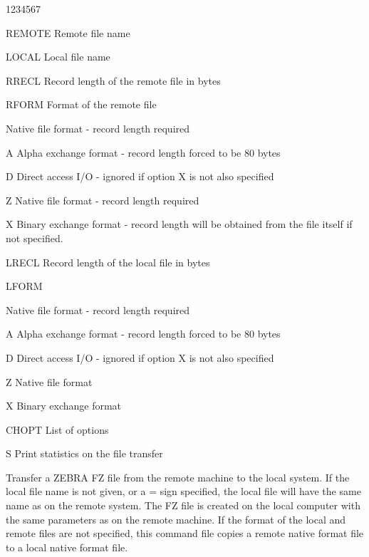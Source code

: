 \begin{DLtt}{1234567}
\item[REMOTE]Remote file name
\item[LOCAL]Local file name
\item[RRECL]Record length of the remote file in bytes
\item[RFORM]Format of the remote file
\begin{DLtt}{12}
\item[ ]Native file format - record length required
\item[A]Alpha exchange format - record length forced to be 80 bytes
\item[D]Direct access I/O - ignored if option X is not also specified
\item[Z]Native file format - record length required
\item[X]Binary exchange format - record length will be obtained from
the file itself if not specified.
\end{DLtt}
\item[LRECL]Record length of the local file in bytes
\item[LFORM]
\begin{DLtt}{12}
\item[ ]Native file format - record length required
\item[A]Alpha exchange format - record length forced to be 80 bytes
\item[D]Direct access I/O - ignored if option X is not also specified
\item[Z]Native file format
\item[X]Binary exchange format
\end{DLtt}
\item[CHOPT]List of options
\begin{DLtt}{12}
\item[S]Print statistics on the file transfer
\end{DLtt}
\end{DLtt}
Transfer a ZEBRA FZ
file from the remote machine to the local system.
If the local file name is not given, or a = sign specified,
the local file will have the same name as on the remote system.
The FZ file is created on the local computer with the same
parameters as on the remote machine.
If the format of the local and remote files are not specified,
this command file copies a remote native format file to a local
native format file.

